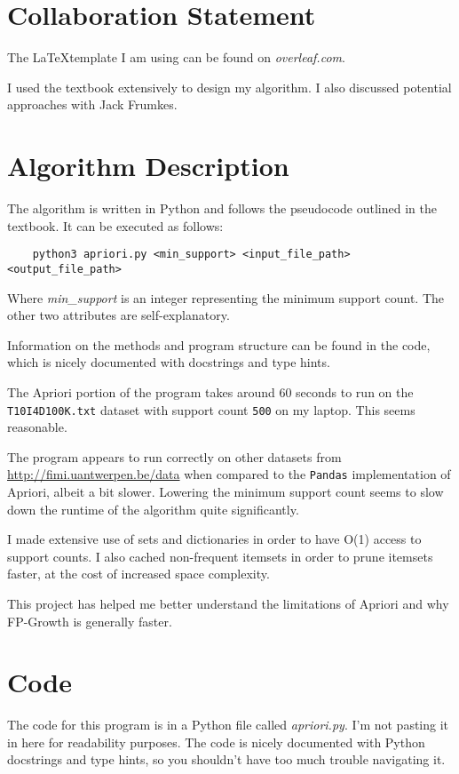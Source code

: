 \documentclass[12pt,letterpaper]{article}
\begin{document}
\section*{Collaboration Statement}

The \LaTeX template I am using can be found on \textit{overleaf.com}.

I used the textbook extensively to design my algorithm. I also discussed potential approaches with Jack Frumkes.

\section{Algorithm Description}

The algorithm is written in Python and follows the pseudocode outlined in the textbook. It can be executed as follows:
\begin{verbatim}
    python3 apriori.py <min_support> <input_file_path> <output_file_path>    
\end{verbatim}{}

Where \textit{min\_support} is an integer representing the minimum support count. The other two attributes are self-explanatory.

 Information on the methods and program structure can be found in the code, which is nicely documented with docstrings and type hints.

The Apriori portion of the program takes around 60 seconds to run on the \texttt{T10I4D100K.txt} dataset with support count \texttt{500} on my laptop. This seems reasonable.

The program appears to run correctly on other datasets from \url{http://fimi.uantwerpen.be/data} when compared to the \texttt{Pandas} implementation of Apriori, albeit a bit slower. Lowering the minimum support count seems to slow down the runtime of the algorithm quite significantly.

I made extensive use of sets and dictionaries in order to have O(1) access to support counts. I also cached non-frequent itemsets in order to prune itemsets faster, at the cost of increased space complexity.

This project has helped me better understand the limitations of Apriori and why FP-Growth is generally faster.

\section{Code}

The code for this program is in a Python file called \textit{apriori.py}. I'm not pasting it in here for readability purposes. The code is nicely documented with Python docstrings and type hints, so you shouldn't have too much trouble navigating it.
\end{document}
